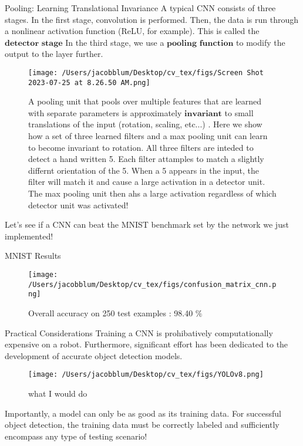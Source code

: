 \documentclass{beamer}
\begin{document}
\begin{frame}[plain]{Pooling: Learning Translational Invariance}
    \small{A typical CNN consists of three stages. In the first stage, convolution is performed. Then, the data is run through a nonlinear activation function (ReLU, for example). This is called the $\textbf{detector stage}$ In the third stage, 
    we use a $\textbf{pooling function}$ to modify the output to the layer further.} 

    \begin{figure}
        \centering
        \texttt{[image: /Users/jacobblum/Desktop/cv\_tex/figs/Screen Shot 2023-07-25 at 8.26.50 AM.png]}
        \caption{A pooling unit that pools over multiple features that are learned with separate parameters is approximately $\textbf{invariant}$ to small translations of the input (rotation, scaling, etc...)
        . Here we show how a set of three learned filters and a max pooling unit can learn to become invariant to rotation. All three filters are inteded to detect a hand written 5. Each filter attamples to match a slightly differnt orientation of the 5. When a 5 appears 
        in the input, the filter will match it and cause a large activation in a detector unit. The max pooling unit then ahs a large activation regardless of which detector unit was activated!}
        
    \end{figure}

\end{frame}



\begin{frame}
    Let's see if a CNN can beat the MNIST benchmark set by the network we just implemented!
\end{frame}

\begin{frame}[plain]{MNIST Results}
    \begin{figure}
        \centering
        \texttt{[image: /Users/jacobblum/Desktop/cv\_tex/figs/confusion\_matrix\_cnn.png]}
        \caption{Overall accuracy on 250 test examples : 98.40 $\%$}
    \end{figure}
\end{frame}

\begin{frame}[plain]{Practical Considerations}
    \small{Training a CNN is prohibatively computationally expensive on a robot. Furthermore, significant effort has been dedicated to the development of accurate object detection models.}

    \begin{figure}
        \centering
        \texttt{[image: /Users/jacobblum/Desktop/cv\_tex/figs/YOLOv8.png]}
        \caption{what I would do}
    \end{figure}

    \small{Importantly, a model can only be as good as its training data. For successful object detection, the training data must be correctly labeled and sufficiently encompass 
    any type of testing scenario!}
\end{frame}
\end{document}
